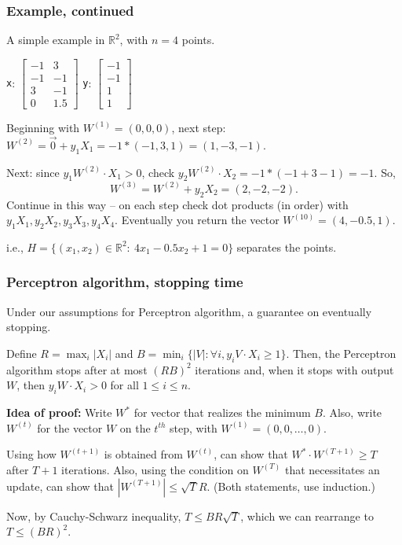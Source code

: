 \documentclass{beamer}
\theoremstyle{example}
\newcommand{\ttt}[1]{{\small\texttt{#1}}}
\begin{document}
\begin{frame}
    \frametitle{Example, continued}
    A simple example in $\mathbb R^2$, with $n=4$ points.

    \begin{center}
    \ttt{x}: $\begin{bmatrix}-1 & 3 \\ -1 & -1 \\ 3 & -1 \\ 0 & 1.5\end{bmatrix}$  \qquad\qquad
    \ttt{y}: $\begin{bmatrix}-1 \\ -1 \\ 1 \\ 1\end{bmatrix}$
    \end{center}

    Beginning with $W^{(1)} = (0,0,0)$, next step: $W^{(2)} = \vec{0} + y_1X_1 = -1\ast(-1,3,1) = (1,-3,-1)$.

    Next: since $y_1W^{(2)}\cdot X_1 > 0$, check $y_2W^{(2)}\cdot X_2 = -1\ast(-1 + 3 -1) = -1$. So, 
        \[W^{(3)} = W^{(2)} + y_2X_2 = (2, -2, -2).\]
    Continue in this way {--} on each step check dot products (in order) with $y_1X_1, y_2X_2, y_3X_3, y_4X_4$. Eventually you return the vector $W^{(10)} = (4, -0.5, 1)$. 
    
    i.e., $H = \{(x_1,x_2)\in \mathbb R^2:\ 4x_1-0.5x_2 + 1 = 0\}$ separates the points.
\end{frame}

\begin{frame}
    \frametitle{Perceptron algorithm, stopping time}
    Under our assumptions for Perceptron algorithm, a guarantee on eventually stopping.

    \begin{theorem}Define $R = \max_i|X_i|$ and $B = \min_i\{|V|: \forall i, y_iV\cdot X_i \ge 1\}$. Then, the Perceptron algorithm stops after at most $(RB)^2$ iterations and, when it stops with output $W$, then $y_iW\cdot X_i > 0$ for all $1\le i\le n$.
    \end{theorem}

    \pause 
    \textbf{Idea of proof:} Write $W^*$ for vector that realizes the minimum $B$. Also, write $W^{(t)}$ for the vector $W$ on the $t^{th}$ step, with $W^{(1)} = (0,0,\ldots,0)$.

    \pause
    Using how $W^{(t+1)}$ is obtained from $W^{(t)}$, can show that $W^*\cdot W^{(T+1)} \ge T$ after $T+1$ iterations. Also, using the condition on $W^{(T)}$ that necessitates an update, can show that $|W^{(T+1)}| \le \sqrt{T}R$. (Both statements, use induction.) 

    \pause
    Now, by Cauchy-Schwarz inequality, $T \le BR\sqrt{T}$, which we can rearrange to $T\le (BR)^2$.
\end{frame}
\end{document}
